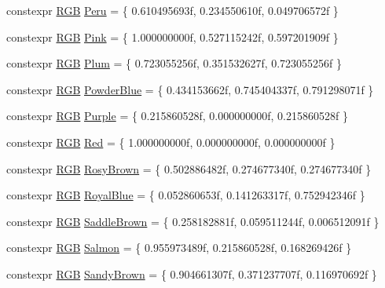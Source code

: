 \begin{DoxyCompactItemize}
\item 
constexpr \mbox{\hyperlink{structmage_1_1_r_g_b}{R\+GB}} \mbox{\hyperlink{namespacemage_1_1color_a6fada3c18d633306e50b65df7bf6c043}{Peru}} = \{ 0.\+610495693f, 0.\+234550610f, 0.\+049706572f \}
\item 
constexpr \mbox{\hyperlink{structmage_1_1_r_g_b}{R\+GB}} \mbox{\hyperlink{namespacemage_1_1color_ae16637717be4ec8fdf6991f24e5ccf27}{Pink}} = \{ 1.\+000000000f, 0.\+527115242f, 0.\+597201909f \}
\item 
constexpr \mbox{\hyperlink{structmage_1_1_r_g_b}{R\+GB}} \mbox{\hyperlink{namespacemage_1_1color_aa46d4f06d75baccba40c0b04ddb88775}{Plum}} = \{ 0.\+723055256f, 0.\+351532627f, 0.\+723055256f \}
\item 
constexpr \mbox{\hyperlink{structmage_1_1_r_g_b}{R\+GB}} \mbox{\hyperlink{namespacemage_1_1color_aa958d1e0bc2c4f67cdd4e74552d63600}{Powder\+Blue}} = \{ 0.\+434153662f, 0.\+745404337f, 0.\+791298071f \}
\item 
constexpr \mbox{\hyperlink{structmage_1_1_r_g_b}{R\+GB}} \mbox{\hyperlink{namespacemage_1_1color_af70cf4f9a882428e08cb958fe75a5a30}{Purple}} = \{ 0.\+215860528f, 0.\+000000000f, 0.\+215860528f \}
\item 
constexpr \mbox{\hyperlink{structmage_1_1_r_g_b}{R\+GB}} \mbox{\hyperlink{namespacemage_1_1color_a244419fcb8dc2b947e0c50af5fa4fb52}{Red}} = \{ 1.\+000000000f, 0.\+000000000f, 0.\+000000000f \}
\item 
constexpr \mbox{\hyperlink{structmage_1_1_r_g_b}{R\+GB}} \mbox{\hyperlink{namespacemage_1_1color_ad16b7dcec432fa50bcc5b1436122c7d4}{Rosy\+Brown}} = \{ 0.\+502886482f, 0.\+274677340f, 0.\+274677340f \}
\item 
constexpr \mbox{\hyperlink{structmage_1_1_r_g_b}{R\+GB}} \mbox{\hyperlink{namespacemage_1_1color_a9a5a96e06db610b817a28c688424f787}{Royal\+Blue}} = \{ 0.\+052860653f, 0.\+141263317f, 0.\+752942346f \}
\item 
constexpr \mbox{\hyperlink{structmage_1_1_r_g_b}{R\+GB}} \mbox{\hyperlink{namespacemage_1_1color_a86715103a7b44781b3193c280e61eac2}{Saddle\+Brown}} = \{ 0.\+258182881f, 0.\+059511244f, 0.\+006512091f \}
\item 
constexpr \mbox{\hyperlink{structmage_1_1_r_g_b}{R\+GB}} \mbox{\hyperlink{namespacemage_1_1color_a16d2bfe7068032f09cb8b8caeac239a8}{Salmon}} = \{ 0.\+955973489f, 0.\+215860528f, 0.\+168269426f \}
\item 
constexpr \mbox{\hyperlink{structmage_1_1_r_g_b}{R\+GB}} \mbox{\hyperlink{namespacemage_1_1color_a60814a5e21ce5f83b39a68435307ebac}{Sandy\+Brown}} = \{ 0.\+904661307f, 0.\+371237707f, 0.\+116970692f \}

\end{DoxyCompactItemize}
